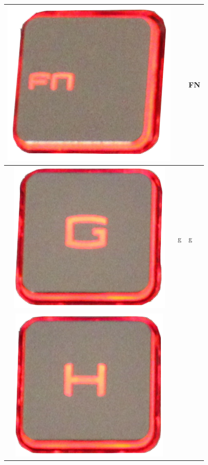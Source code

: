 \begin{longtable}{|cll|}
\begin{minipage}[c]{.3\textwidth}
\includegraphics[scale=0.06]{Images/KeyMapping/FN}
\vspace{0.2cm}
\end{minipage} &  & FN\\
\hline
\begin{minipage}[c]{.3\textwidth}
\vspace{0.2cm}
\includegraphics[scale=0.06]{Images/KeyMapping/g}
\vspace{0.2cm}
\end{minipage} & g & g\\
\hline
\begin{minipage}[c]{.3\textwidth}
\vspace{0.2cm}
\includegraphics[scale=0.06]{Images/KeyMapping/h}

\end{minipage}
\end{longtable}
